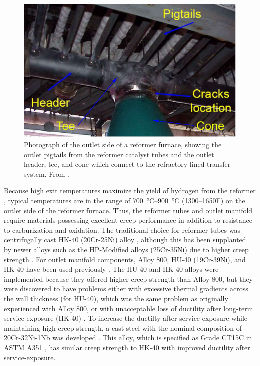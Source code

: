 \begin{figure}[h]
\centering
\includegraphics{figures/reformer-tee-cone}
\caption{Photograph of the outlet side of a reformer furnace, showing the outlet pigtails from the reformer catalyst tubes and the outlet header, tee, and cone which connect to the refractory-lined transfer system.  From \citet{penso_repair_2006}.}
\label{fig:reformer-tee-cone}
\end{figure}

Because high exit temperatures maximize the yield of hydrogen from the reformer \cite{haussinger_hydrogen_2000}, typical temperatures are in the range of \SIrange[range-phrase=--]{700}{900}{\degreeCelsius} (\numrange[range-phrase=--]{1300}{1650}\textdegree{}F) on the outlet side of the reformer furnace. Thus, the reformer tubes and outlet manifold require materials possessing excellent creep performance in addition to resistance to carburization and oxidation. The traditional choice for reformer tubes was centrifugally cast HK-40 (20Cr-25Ni) alloy \cite{rostrup-nielsen_catalytic_1984}, although this has been supplanted by newer alloys such as the HP-Modified alloys (25Cr-35Ni) due to higher creep strength \cite{schillmoller_hp-modified_1992}. For outlet manifold components, Alloy 800, HU-40 (19Cr-39Ni), and HK-40 have been used previously \cite{shibasaki_experience_1994}. The HU-40 and HK-40 alloys were implemented because they offered higher creep strength than Alloy 800, but they were discovered to have problems either with excessive thermal gradients across the wall thickness (for HU-40), which was the same problem as originally experienced with Alloy 800, or with unacceptable loss of ductility after long-term service exposure (HK-40) \cite{shibasaki_experience_1994,collins_effect_1980}. To increase the ductilty after service exposure while maintaining high creep strength, a cast steel with the nominal composition of 20Cr-32Ni-1Nb was developed \cite{collins_effect_1980}. This alloy, which is specified as Grade CT15C in ASTM A351 \cite{astm_a351_2010}, has similar creep strength to HK-40 \cite{shibasaki_experience_1994} with improved ductility after service-exposure. 


